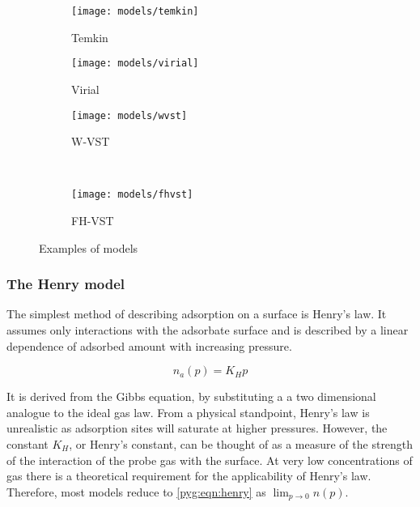 \begin{figure}[p]
\begin{subfigure}{0.3\linewidth}
		\parbox[c]{1.0\linewidth}{\caption{Temkin}%
			\label{pyg:fgr:temkinex}}

		\parbox[b]{1.0\linewidth}{%

			\texttt{[image: models/temkin]}}
	\end{subfigure}%
	\begin{subfigure}{0.3\linewidth}

		\parbox[c]{1.0\linewidth}{\caption{Virial}%
			\label{pyg:fgr:virialex}}

		\parbox[b]{1.0\linewidth}{%

			\texttt{[image: models/virial]}}
	\end{subfigure}%
	\begin{subfigure}{0.3\linewidth}

		\parbox[c]{1.0\linewidth}{\caption{W-VST}%
			\label{pyg:fgr:wsvstex}}

		\parbox[b]{1.0\linewidth}{%

			\texttt{[image: models/wvst]}}
	\end{subfigure}%
	\\
	\begin{subfigure}{0.3\linewidth}

		\parbox[c]{1.0\linewidth}{\caption{FH-VST}%
			\label{pyg:fgr:fhvstex}}

		\parbox[b]{1.0\linewidth}{%

			\texttt{[image: models/fhvst]}}
	\end{subfigure}%

	\caption{Examples of models
	}%
	\label{pyg:fgr:modelex}
\end{figure}

\subsubsection{The Henry model}\label{pyg:models:henry}

The simplest method of describing adsorption on a
surface is Henry’s law. It assumes only interactions
with the adsorbate surface and is described by a
linear dependence of adsorbed amount with
increasing pressure.

\begin{equation}\label{pyg:eqn:henry}
	n_a(p) = K_H p
\end{equation}

It is derived from the Gibbs equation, by substituting a
a two dimensional analogue to the ideal gas law.
From a physical standpoint, Henry's law is unrealistic as adsorption sites
will saturate at higher pressures. However, the constant \(K_H\),
or Henry’s constant, can be thought of as a measure of the strength
of the interaction of the probe gas with the surface. At very
low concentrations of gas there is a
theoretical requirement for the applicability of Henry's law.
Therefore, most models reduce to \autoref{pyg:eqn:henry}
as \(\lim_{p \to 0} n(p)\).

